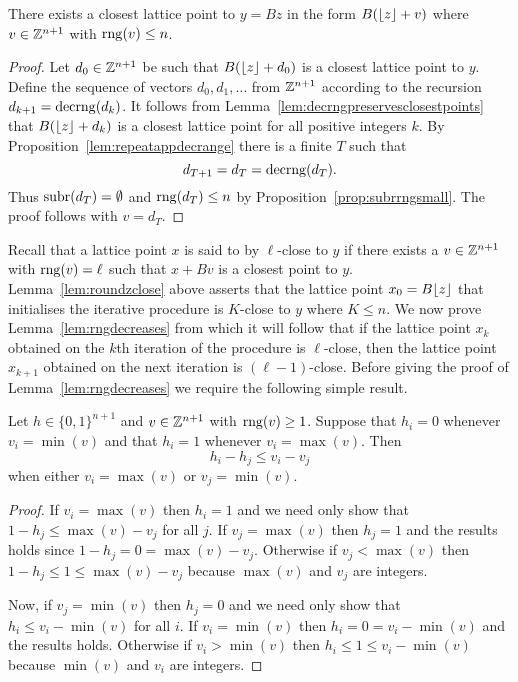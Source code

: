 \documentclass[final,leqno]{siamltex}
\begin{document}
\begin{lemma}\label{lem:roundzclose}
There exists a closest lattice point to $y = Bz$ in the form $B({\left\lfloor z \right\rfloor} + v)$ where $v \in {\mathbb Z}^{n+1}$ with $\operatorname{rng}(v) \leq n$.
\end{lemma}
\begin{proof}
Let $d_0 \in {\mathbb Z}^{n+1}$ be such that $B({\left\lfloor z \right\rfloor} + d_0)$ is a closest lattice point to $y$. Define the sequence of vectors $d_0,d_1,\dots$ from ${\mathbb Z}^{n+1}$ according to the recursion $d_{k+1} = \operatorname{decrng}(d_k)$.  It follows from Lemma~\ref{lem:decrngpreservesclosestpoints} that $B({\left\lfloor z \right\rfloor} + d_{k})$ is a closest lattice point for all positive integers $k$.  By Proposition~\ref{lem:repeatappdecrange} there is a finite $T$ such that 
\[
d_{T+1}=d_T=\operatorname{decrng}(d_T).
\]  
Thus $\operatorname{subr}(d_T) = \emptyset$ and $\operatorname{rng}(d_T) \leq n$ by Proposition~\ref{prop:subrrngsmall}.  The proof follows with $v = d_T$.   
\end{proof}


Recall that a lattice point $x$ is said to by $\ell$-close to $y$ if there exists a $v \in {\mathbb Z}^{n+1}$ with $\operatorname{rng}(v) = \ell$ such that $x + Bv$ is a closest point to $y$.  Lemma~\ref{lem:roundzclose} above asserts that the lattice point $x_0 = B{\left\lfloor z \right\rfloor}$ that initialises the iterative procedure is $K$-close to $y$ where $K \leq n$.  We now prove Lemma~\ref{lem:rngdecreases} from which it will follow that if the lattice point $x_k$ obtained on the $k$th iteration of the procedure is $\ell$-close, then the lattice point $x_{k+1}$ obtained on the next iteration is $(\ell-1)$-close.  Before giving the proof of Lemma~\ref{lem:rngdecreases} we require the following simple result.

\begin{lemma}\label{eq:integergreaterless}
Let $h \in \{0,1\}^{n+1}$ and $v \in {\mathbb Z}^{n+1}$ with $\operatorname{rng}(v) \geq 1$.  Suppose that
$h_i = 0$ whenever $v_i = \min(v)$ and that $h_i = 1$ whenever $v_i = \max(v)$.  Then
\[
h_i - h_j \leq v_i - v_j
\]
when either $v_i = \max(v)$ or $v_j = \min(v)$.
\end{lemma}
\begin{proof}
If $v_i = \max(v)$ then $h_i = 1$ and we need only show that $1-h_j \leq \max(v) - v_j$ for all $j$.  If $v_j = \max(v)$ then $h_j = 1$ and the results holds since $1 - h_j = 0 = \max(v) - v_j$.  Otherwise if $v_j < \max(v)$ then $1-h_j \leq 1 \leq \max(v) - v_j$ because $\max(v)$ and $v_j$ are integers.

Now, if $v_j = \min(v)$ then $h_j = 0$ and we need only show that $h_i \leq v_i - \min(v)$ for all $i$.  If $v_i = \min(v)$ then $h_i = 0 = v_i - \min(v)$ and the results holds.  Otherwise if $v_i > \min(v)$ then $h_i \leq 1 \leq v_i - \min(v)$ because $\min(v)$ and $v_i$ are integers.
\end{proof}
\end{document}
